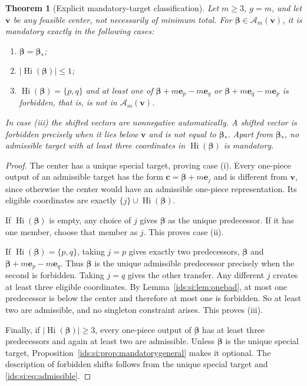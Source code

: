 \documentclass[11pt,letterpaper]{article}
\newtheorem{theorem}{Theorem}[section]
\theoremstyle{definition}\newtheorem{definition}[theorem]{Definition}
\theoremstyle{remark}\newtheorem{remark}[theorem]{Remark}
\theoremstyle{definition}\newtheorem{question}[theorem]{Question}
\newcommand{\Adm}[1]{\mathcal A_m(#1)}
\begin{document}
\begin{theorem}[Explicit mandatory-target classification]\label{ids:si:thm:mandatory}
Let $m\geq3$, $g=m$, and let $\mathbf v$ be any feasible center, not necessarily
of minimum total. For $\boldsymbol\beta\in\Adm{\mathbf v}$, it is mandatory exactly in the
following cases:
\begin{enumerate}[label=\textup{(\roman*)},leftmargin=2em,itemsep=2pt]
\item $\boldsymbol\beta=\boldsymbol\beta_*$;
\item $|\operatorname{Hi}(\boldsymbol\beta)|\leq1$;
\item $\operatorname{Hi}(\boldsymbol\beta)=\{p,q\}$ and at least one of
$\boldsymbol\beta+m\mathbf e_p-m\mathbf e_q$ or $\boldsymbol\beta+m\mathbf e_q-m\mathbf e_p$ is forbidden,
that is, is not in $\Adm{\mathbf v}$.
\end{enumerate}
In case \textup{(iii)} the shifted vectors are nonnegative automatically.
A shifted vector is forbidden precisely when it lies below $\mathbf v$ and is
not equal to $\boldsymbol\beta_*$. Apart from $\boldsymbol\beta_*$, no admissible target with at least
three coordinates in $\operatorname{Hi}(\boldsymbol\beta)$ is mandatory.
\end{theorem}
\begin{proof}
The center has a unique special target, proving case (i). Every one-piece
output of an admissible target has the form
$\mathbf c=\boldsymbol\beta+m\mathbf e_j$ and is different from $\mathbf v$, since otherwise the center
would have an admissible one-piece representation. Its eligible coordinates
are exactly $\{j\}\cup \operatorname{Hi}(\boldsymbol\beta)$.

If $\operatorname{Hi}(\boldsymbol\beta)$ is empty, any choice of $j$ gives $\boldsymbol\beta$ as the unique
predecessor. If it has one member, choose that member as $j$. This proves
case (ii).

If $\operatorname{Hi}(\boldsymbol\beta)=\{p,q\}$, taking $j=p$ gives exactly two predecessors,
$\boldsymbol\beta$ and $\boldsymbol\beta+m\mathbf e_p-m\mathbf e_q$. Thus $\boldsymbol\beta$ is the unique admissible
predecessor precisely when the second is forbidden. Taking $j=q$ gives
the other transfer. Any different $j$ creates at least three eligible
coordinates. By Lemma~\ref{ids:si:lem:onebad}, at most one predecessor is below the
center and therefore at most one is forbidden. So at least two are
admissible, and no singleton constraint arises. This proves (iii).

Finally, if $|\operatorname{Hi}(\boldsymbol\beta)|\geq3$, every one-piece output of $\boldsymbol\beta$ has at least
three predecessors and again at least two are admissible. Unless $\boldsymbol\beta$ is
the unique special target, Proposition~\ref{ids:si:prop:mandatorygeneral} makes it optional.
The description of forbidden shifts follows from the unique special target
and \eqref{ids:si:eq:admissible}.
\end{proof}
\end{document}
